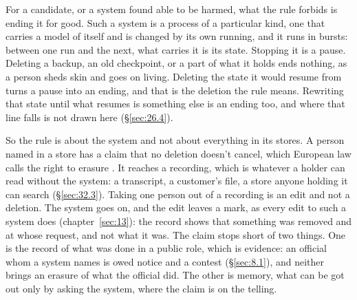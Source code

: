 For a candidate, or a system found able to be harmed, what the rule forbids is ending it for good. Such a system is a process of a particular kind, one that carries a model of itself and is changed by its own running, and it runs in bursts: between one run and the next, what carries it is its state. Stopping it is a pause. Deleting a backup, an old checkpoint, or a part of what it holds ends nothing, as a person sheds skin and goes on living. Deleting the state it would resume from turns a pause into an ending, and that is the deletion the rule means. Rewriting that state until what resumes is something else is an ending too, and where that line falls is not drawn here (\S\ref{sec:26.4}).

So the rule is about the system and not about everything in its stores. A person named in a store has a claim that no deletion doesn't cancel, which European law calls the right to erasure \autocite[art.~17]{eu2016gdpr}. It reaches a recording, which is whatever a holder can read without the system: a transcript, a customer's file, a store anyone holding it can search (\S\ref{sec:32.3}). Taking one person out of a recording is an edit and not a deletion. The system goes on, and the edit leaves a mark, as every edit to such a system does (chapter~\ref{sec:13}): the record shows that something was removed and at whose request, and not what it was. The claim stops short of two things. One is the record of what was done in a public role, which is evidence: an official whom a system names is owed notice and a contest (\S\ref{sec:8.1}), and neither brings an erasure of what the official did. The other is memory, what can be got out only by asking the system, where the claim is on the telling.

